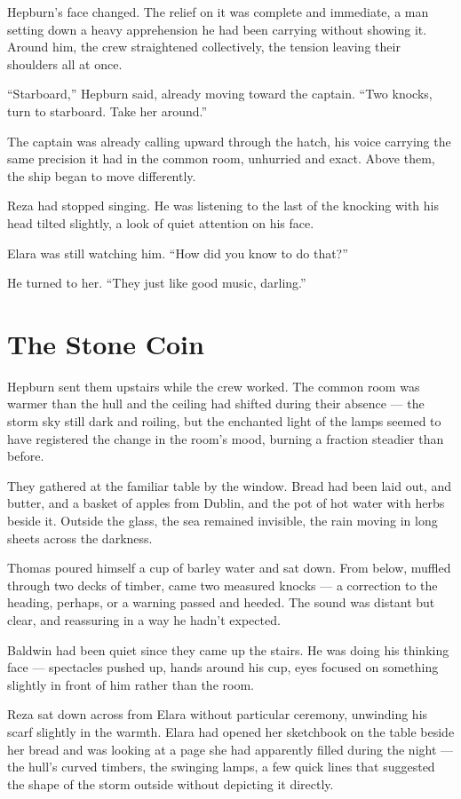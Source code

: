 Hepburn's face changed. The relief on it was complete and immediate, a man setting down a heavy apprehension he had been carrying without showing it. Around him, the crew straightened collectively, the tension leaving their shoulders all at once.

\enquote{Starboard,} Hepburn said, already moving toward the captain. \enquote{Two knocks, turn to starboard. Take her around.}

The captain was already calling upward through the hatch, his voice carrying the same precision it had in the common room, unhurried and exact. Above them, the ship began to move differently.

Reza had stopped singing. He was listening to the last of the knocking with his head tilted slightly, a look of quiet attention on his face.

Elara was still watching him. \enquote{How did you know to do that?}

He turned to her. \enquote{They just like good music, darling.}

\section*{The Stone Coin}

Hepburn sent them upstairs while the crew worked. The common room was warmer than the hull and the ceiling had shifted during their absence --- the storm sky still dark and roiling, but the enchanted light of the lamps seemed to have registered the change in the room's mood, burning a fraction steadier than before.

They gathered at the familiar table by the window. Bread had been laid out, and butter, and a basket of apples from Dublin, and the pot of hot water with herbs beside it. Outside the glass, the sea remained invisible, the rain moving in long sheets across the darkness.

Thomas poured himself a cup of barley water and sat down. From below, muffled through two decks of timber, came two measured knocks --- a correction to the heading, perhaps, or a warning passed and heeded. The sound was distant but clear, and reassuring in a way he hadn't expected.

Baldwin had been quiet since they came up the stairs. He was doing his thinking face --- spectacles pushed up, hands around his cup, eyes focused on something slightly in front of him rather than the room.

Reza sat down across from Elara without particular ceremony, unwinding his scarf slightly in the warmth. Elara had opened her sketchbook on the table beside her bread and was looking at a page she had apparently filled during the night --- the hull's curved timbers, the swinging lamps, a few quick lines that suggested the shape of the storm outside without depicting it directly.

